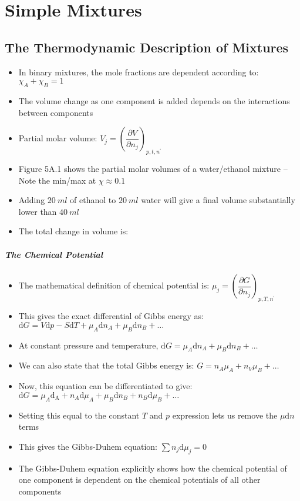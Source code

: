 \documentclass[12pt, openany, letterpaper]{memoir}
\begin{document}
\chapter{Simple Mixtures}
\section{The Thermodynamic Description of Mixtures}
\begin{itemize}
	\item In binary mixtures, the mole fractions are dependent according to: $\chi_A+\chi_B=1$
	\item The volume change as one component is added depends on the interactions between components
	\item Partial molar volume: $V_j=\left(\dfrac{\partial V}{\partial n_j}\right)_{p,t,n^\prime}$
	\item Figure 5A.1 shows the partial molar volumes of a water/ethanol mixture -- Note the min/max at $\chi\approx0.1$
	\item Adding $20~ml$ of ethanol to $20~ml$ water will give a final volume substantially lower than $40~ml$
	\item The total change in volume is: 
\end{itemize}
\paragraph{The Chemical Potential}
\begin{itemize}
	\item The mathematical definition of chemical potential is: $\mu_j = \left(\dfrac{\partial G}{\partial n_j}\right)_{p,T,n^\prime}$
	\item This gives the exact differential of Gibbs energy as: $\mathrm{d}G = V\mathrm{d}p-S\mathrm{d}T+\mu_A\mathrm{d}n_A+\mu_B\mathrm{d}n_B+\ldots$
	\item At constant pressure and temperature, $\mathrm{d}G = \mu_A\mathrm{d}n_A+\mu_B\mathrm{d}n_B+\ldots$
	\item We can also state that the total Gibbs energy is: $G = n_A\mu_A + n_V\mu_B+\ldots$
	\item Now, this equation can be differentiated to give: $\mathrm{d}G = \mu_A\mathrm{d_A} + n_A\mathrm{d}\mu_A + \mu_B\mathrm{d}n_B + n_B\mathrm{d}\mu_B+\ldots$
	\item Setting this equal to the constant $T$ and $p$ expression lets us remove the $\mu\mathrm{d}n$ terms
	\item This gives the Gibbs-Duhem equation: $\displaystyle\sum n_j\mathrm{d}\mu_j = 0$
	\item The Gibbs-Duhem equation explicitly shows how the chemical potential of one component is dependent on the chemical potentials of all other components
\end{itemize}
\end{document}
